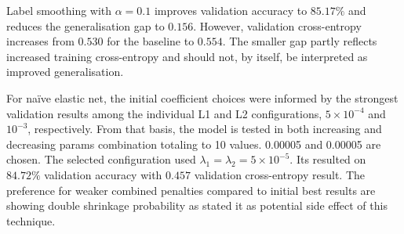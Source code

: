 {{Label smoothing with \(\alpha=0.1\) improves validation accuracy to \(85.17\%\) and reduces the generalisation gap to \(0.156\). However, validation cross-entropy increases from \(0.530\) for the baseline to \(0.554\). The smaller gap partly reflects increased training cross-entropy and should not, by itself, be interpreted as improved generalisation.

For naïve elastic net, the initial coefficient choices were informed by the strongest validation results among the individual L1 and L2 configurations, \(5\times10^{-4}\) and \(10^{-3}\), respectively. From that basis, the model is tested in both increasing and decreasing params combination totaling to 10 values. 0.00005 and 0.00005 are chosen. The selected configuration used
\(\lambda_1=\lambda_2=5\times10^{-5}\). Its resulted on \(84.72\%\) validation accuracy with \(0.457\) validation cross-entropy result. The preference for weaker combined penalties compared to initial best results are showing double shrinkage probability as \citet{zou2005elasticnet} stated it as potential side effect of this technique.
}
}

\newcommand{\questionThree} {
\youranswer{Question 3 - Using the supplied results and your experiments in Table~3, select and justify exactly \textbf{10} additional configurations varying the regularisation techniques and their hyperparameters. Select and justify all ten configurations before running them; sequential selection based on their results is not permitted. Follow the common experimental settings specified in the coursework description. These ten runs exclude the five runs needed to complete Table~3, the independent-method experiment in Question~5, and any necessary retraining for test evaluation. Run the ten experiments and present their results in Table~4 and Figure~5. You are assessed on your justification, correct experimental setup and execution, and analysis of the results, rather than on achieving high performance. Discuss the results in Question~4.}
}


